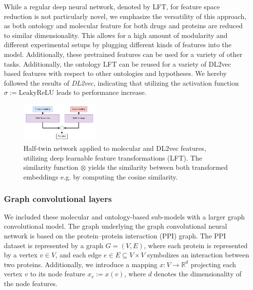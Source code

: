 \documentclass{bioinfo}
\begin{document}
While a regular deep neural network, denoted by LFT, for feature space reduction is not particularly novel, we emphasize the versatility of this approach, as both ontology and molecular feature for both drugs and proteins are reduced to similar dimensionality. This allows for a high amount of modularity and different experimental setups by plugging different kinds of features into the model. Additionally, these pretrained features can be used for a variety of other tasks. Additionally, the ontology LFT can be reused for a variety of DL2vec based features with respect to other ontologies and hypotheses. We hereby followed the results of \textit{DL2vec}, indicating that utilizing the activation function $\sigma := \mathrm{LeakyReLU}$ leads to performance increase.



\begin{figure}[!tpb]%
	\centerline{\includegraphics[width=0.35\textwidth]{figures/siamese_network.png}}
	\caption{Half-twin network applied to molecular and DL2vec
          features, utilizing deep learnable feature transformations
          (LFT). The similarity function $\otimes$ yields the
          similarity between both transformed embeddings e.g. by
          computing the cosine similarity.}
	\label{fig:HalfTwinNetwork}
\end{figure}




\subsubsection{Graph convolutional layers}

We included these molecular and ontology-based sub-models with a
larger graph convolutional model. The graph underlying the graph
convolutional neural network is based on the protein--protein
interaction (PPI) graph. The PPI dataset is represented by a graph
$G=(V,E)$, where each protein is represented by a vertex $v\in V$, and
each edge $e\in E\subseteq V\times V$ symbolizes an interaction
between two proteins. Additionally, we introduce a mapping
$x:V\rightarrow\mathbb{R}^{d}$ projecting each vertex $v$ to its node
feature $x_v := x(v)$, where $d$ denotes the dimensionality of the node
features.
 
\end{document}
